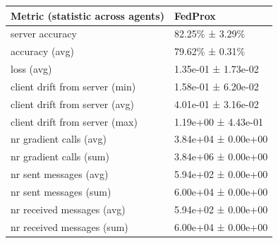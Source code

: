 \begin{tabular}{ll}
\hline
 Metric (statistic across agents)   & FedProx             \\
\hline
 server accuracy                    & 82.25\% ± 3.29\%      \\
 accuracy (avg)                     & 79.62\% ± 0.31\%      \\
 loss (avg)                         & 1.35e-01 ± 1.73e-02 \\
 client drift from server (min)     & 1.58e-01 ± 6.20e-02 \\
 client drift from server (avg)     & 4.01e-01 ± 3.16e-02 \\
 client drift from server (max)     & 1.19e+00 ± 4.43e-01 \\
 nr gradient calls (avg)            & 3.84e+04 ± 0.00e+00 \\
 nr gradient calls (sum)            & 3.84e+06 ± 0.00e+00 \\
 nr sent messages (avg)             & 5.94e+02 ± 0.00e+00 \\
 nr sent messages (sum)             & 6.00e+04 ± 0.00e+00 \\
 nr received messages (avg)         & 5.94e+02 ± 0.00e+00 \\
 nr received messages (sum)         & 6.00e+04 ± 0.00e+00 \\
\hline
\end{tabular}